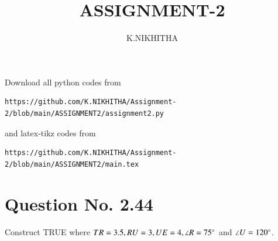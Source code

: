 \documentclass[journal,12pt,twocolumn]{IEEEtran}
\begin{document}
     \def\centbox#1{\makebox[0in]{#1}}
     \def\topbox#1{\raisebox{-\baselineskip}[0in][0in]{#1}}
     \def\midbox#1{\raisebox{-0.5\baselineskip}[0in][0in]{#1}}
\vspace{3cm}
\title{ASSIGNMENT-2}
\author{K.NIKHITHA}
\maketitle
\newpage
\bigskip
\renewcommand{\thefigure}{\theenumi}
\renewcommand{\thetable}{\theenumi}
Download all python codes from 
\begin{lstlisting}
https://github.com/K.NIKHITHA/Assignment-2/blob/main/ASSIGNMENT2/assignment2.py
\end{lstlisting}
%
and latex-tikz codes from 
%
\begin{lstlisting}
https://github.com/K.NIKHITHA/Assignment-2/blob/main/ASSIGNMENT2/main.tex
\end{lstlisting}
%
\section{Question No. 2.44}
Construct TRUE where $TR = 3.5, RU = 3, UE = 4, \angle R = 75 \degree$ and $\angle U = 120 \degree$.
%
\end{document}
